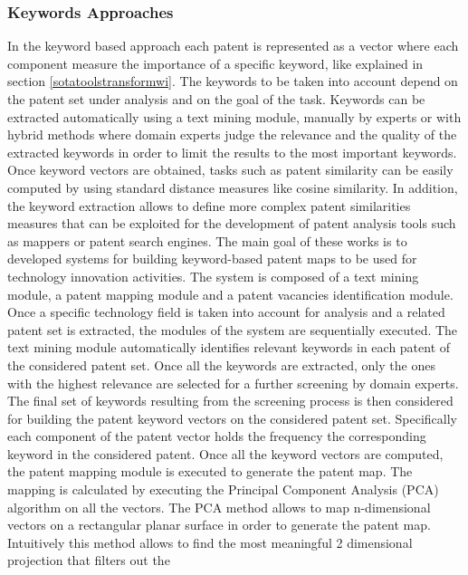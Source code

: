 \documentclass[]{book}
\begin{document}
\subsubsection{Keywords Approaches}\label{keywords-approaches}

In the keyword based approach each patent is represented as a vector
where each component measure the importance of a specific keyword, like
explained in section \ref{sotatoolstransformwi}. The keywords to be
taken into account depend on the patent set under analysis and on the
goal of the task. Keywords can be extracted automatically using a text
mining module, manually by experts or with hybrid methods where domain
experts judge the relevance and the quality of the extracted keywords in
order to limit the results to the most important keywords. Once keyword
vectors are obtained, tasks such as patent similarity can be easily
computed by using standard distance measures like cosine similarity. In
addition, the keyword extraction allows to define more complex patent
similarities measures \citep{moehrle2010measures} that can be exploited
for the development of patent analysis tools
\citep[\citet{lee2015novelty}]{lee2009approach} such as mappers or
patent search engines. The main goal of these works is to developed
systems for building keyword-based patent maps to be used for technology
innovation activities. The system is composed of a text mining module, a
patent mapping module and a patent vacancies identification module. Once
a specific technology field is taken into account for analysis and a
related patent set is extracted, the modules of the system are
sequentially executed. The text mining module automatically identifies
relevant keywords in each patent of the considered patent set. Once all
the keywords are extracted, only the ones with the highest relevance are
selected for a further screening by domain experts. The final set of
keywords resulting from the screening process is then considered for
building the patent keyword vectors on the considered patent set.
Specifically each component of the patent vector holds the frequency the
corresponding keyword in the considered patent. Once all the keyword
vectors are computed, the patent mapping module is executed to generate
the patent map. The mapping is calculated by executing the Principal
Component Analysis (PCA) algorithm on all the vectors. The PCA method
allows to map n-dimensional vectors on a rectangular planar surface in
order to generate the patent map. Intuitively this method allows to find
the most meaningful 2 dimensional projection that filters out the
\end{document}
